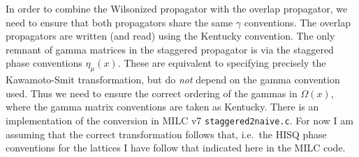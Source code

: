 \documentclass[11pt,a4paper]{article}
\begin{document}
In order to combine the Wilsonized propagator with the overlap propagator,
we need to ensure that both propagators share the same $\gamma$ conventions.
The overlap propagators are written (and read) using the Kentucky convention.
The only remnant of gamma matrices in the staggered propagator is via the staggered
phase conventions $\eta_\mu(x)$.  
These are equivalent to specifying precisely the Kawamoto-Smit transformation,
but do \emph{not} depend on the gamma convention used.  
Thus we need to ensure the correct ordering of the gammas in $\Omega(x)$,
 where the gamma matrix conventions are taken as Kentucky.
 There is an implementation of the conversion in MILC v7 {\tt staggered2naive.c}.
 For now I am assuming that the correct transformation follows that, 
 i.e.\ the HISQ phase conventions for the lattices I have follow that indicated here in the MILC code.

\end{document}
